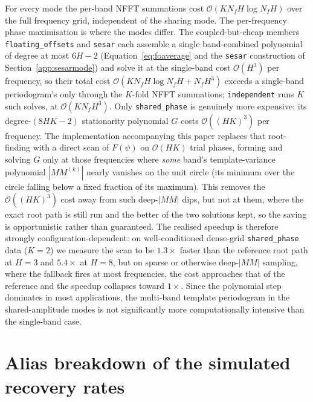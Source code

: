 \documentclass[apj]{emulateapj}
\newcommand{\bigO}{\mathcal{O}}
\newcommand{\eith}{\psi}
\begin{document}
\begin{appendix}
For every mode the per-band NFFT summations cost $\bigO(KN_fH\log N_fH)$ over the full frequency grid, independent of the sharing mode. The per-frequency phase maximisation is where the modes differ. The coupled-but-cheap members \texttt{floating\_offsets} and \texttt{sesar} each assemble a single band-combined polynomial of degree at most $6H-2$ (Equation~\ref{eq:foaverage} and the \texttt{sesar} construction of Section~\ref{app:sesarmode}) and solve it at the single-band cost $\bigO(H^3)$ per frequency, so their total cost $\bigO(KN_fH\log N_fH + N_fH^3)$ exceeds a single-band periodogram's only through the $K$-fold NFFT summations; \texttt{independent} runs $K$ such solves, at $\bigO(KN_fH^3)$. Only \texttt{shared\_phase} is genuinely more expensive: its degree-$(8HK-2)$ stationarity polynomial $G$ costs $\bigO((HK)^3)$ per frequency. The implementation accompanying this paper replaces that root-finding with a direct scan of $F(\eith)$ on $\bigO(HK)$ trial phases, forming and solving $G$ only at those frequencies where \emph{some} band's template-variance polynomial $|MM^{(k)}|$ nearly vanishes on the unit circle (its minimum over the circle falling below a fixed fraction of its maximum). This removes the $\bigO((HK)^3)$ cost away from such deep-$|MM|$ dips, but not at them, where the exact root path is still run and the better of the two solutions kept, so the saving is opportunistic rather than guaranteed. The realised speedup is therefore strongly configuration-dependent: on well-conditioned dense-grid \texttt{shared\_phase} data ($K=2$) we measure the scan to be $1.3\times$ faster than the reference root path at $H=3$ and $5.4\times$ at $H=8$, but on sparse or otherwise deep-$|MM|$ sampling, where the fallback fires at most frequencies, the cost approaches that of the reference and the speedup collapses toward $1\times$. Since the polynomial step dominates in most applications, the multi-band template periodogram in the shared-amplitude modes is not significantly more computationally intensive than the single-band case.

\section{Alias breakdown of the simulated recovery rates}
\label{app:aliases}


\end{appendix}
\end{document}
